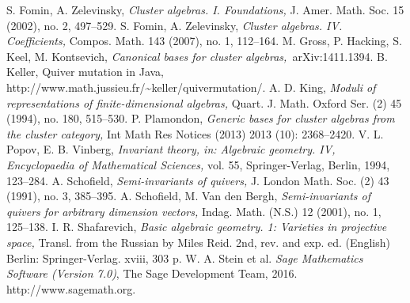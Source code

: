\documentclass{amsart}
\theoremstyle{definition}
\theoremstyle{remark}
\numberwithin{equation}{section}
\begin{document}
\begin{thebibliography}{99}
 S. Fomin, A. Zelevinsky, \textit{Cluster algebras. I. Foundations,} J. Amer. Math. Soc. 15 (2002), no. 2, 497--529.
 S. Fomin, A. Zelevinsky, \textit{Cluster algebras. IV. Coefficients,} Compos. Math. 143 (2007), no. 1, 112--164.
 M. Gross, P. Hacking, S. Keel, M. Kontsevich, \textit{Canonical bases for cluster algebras,}~arXiv:1411.1394.
 B. Keller, Quiver mutation in Java, http://www.math.jussieu.fr/\~{}keller/quivermutation/.
 A. D. King, \textit{Moduli of representations of finite-dimensional algebras,} Quart. J. Math. Oxford Ser. (2) 45 (1994), no. 180, 515--530.
 P. Plamondon, \textit{Generic bases for cluster algebras from the cluster category,} Int Math Res Notices (2013) 2013 (10): 2368--2420.
 V. L. Popov, E. B. Vinberg, \textit{Invariant theory, in: Algebraic geometry. IV, Encyclopaedia of Mathematical Sciences,} vol. 55, Springer-Verlag, Berlin, 1994, 123--284.
 A. Schofield, \textit{Semi-invariants of quivers,} J. London Math. Soc. (2) 43 (1991), no. 3, 385--395.
 A. Schofield, M. Van den Bergh, \textit{Semi-invariants of quivers for arbitrary dimension vectors,} Indag. Math. (N.S.) 12 (2001), no. 1, 125--138.
 I. R. Shafarevich, \textit{Basic algebraic geometry. 1: Varieties in projective space,} Transl. from the Russian by Miles Reid. 2nd, rev. and exp. ed. (English) Berlin: Springer-Verlag. xviii, 303 p.
 W. A. Stein et al. \textit{Sage Mathematics Software (Version 7.0)}, The Sage Development Team, 2016. http://www.sagemath.org.
\end{thebibliography}
\end{document}

